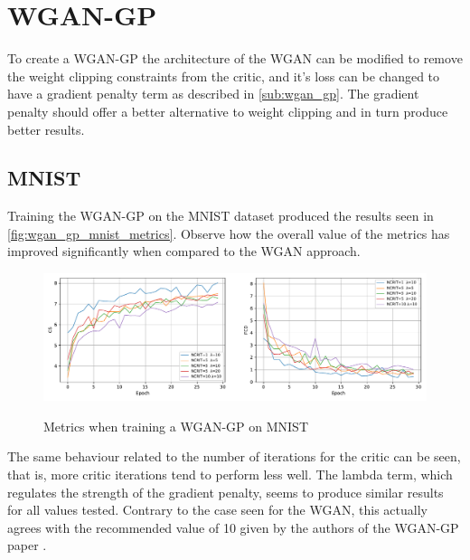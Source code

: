 \section{WGAN-GP}
To create a \gls{WGAN-GP} the architecture of the \gls{WGAN} can be modified to remove the weight clipping constraints from the critic, and it's loss can be changed to have a gradient penalty term as described in \autoref{sub:wgan_gp}. The gradient penalty should offer a better alternative to weight clipping and in turn produce better results.

\subsection{MNIST}
Training the \gls{WGAN-GP} on the \gls{MNIST} dataset produced the results seen in \autoref{fig:wgan_gp_mnist_metrics}. Observe how the overall value of the metrics has improved significantly when compared to the \gls{WGAN} approach.
\begin{figure}[hbt]
    \centering
    \caption{Metrics when training a WGAN-GP on MNIST}
    \includegraphics[width=\textwidth]{chapters/Experiments/WGAN-GP/mnist_metrics.pdf}
    \label{fig:wgan_gp_mnist_metrics}
\end{figure}

The same behaviour related to the number of iterations for the critic can be seen, that is, more critic iterations tend to perform less well. The \gls{lambda} term, which regulates the strength of the gradient penalty, seems to produce similar results for all values tested. Contrary to the case seen for the \gls{WGAN}, this actually agrees with the recommended value of 10 given by the authors of the \gls{WGAN-GP} paper \cite{wgan-gp2017}.

